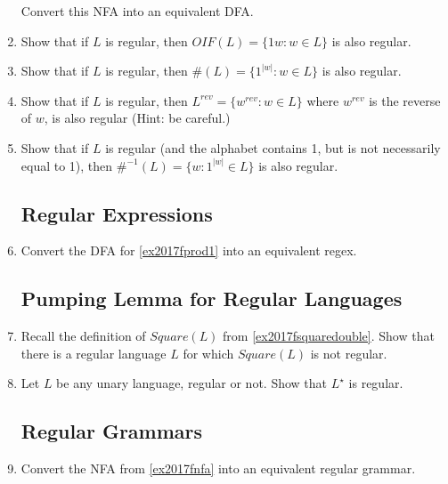 \begin{enumerate}
Convert this NFA into an equivalent DFA.

\item {} Show that if $L$ is regular, then $OIF(L) = \{1w : w \in L \}$ is also regular.

\item {} Show that if $L$ is regular, then $\#(L) = \{1^{|w|} : w \in L\}$ is also regular.

\item {} Show that if $L$ is regular, then $L^{rev} = \{w^{rev} : w \in L\}$ where $w^{rev}$ is the reverse of $w$, is also regular (Hint: be careful.)

\item {} Show that if $L$ is regular (and the alphabet contains 1, but is not necessarily equal to 1), then $\#^{-1}(L) = \{w : 1^{|w|} \in L\}$ is also regular.



\subsection{Regular Expressions}

\item {} Convert the DFA for \cref{ex2017fprod1} into an equivalent regex.

\subsection{Pumping Lemma for Regular Languages}

\item {} Recall the definition of $Square(L)$ from \cref{ex2017fsquaredouble}. 
Show that there is a regular language $L$ for which $Square(L)$ is not regular.

\item {} Let $L$ be any unary language, regular or not. Show that $L^\star$ is regular.

\subsection{Regular Grammars}

\item {} Convert the NFA from \cref{ex2017fnfa} into an equivalent regular grammar.

\end{enumerate}